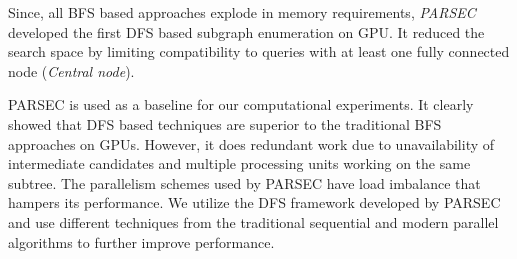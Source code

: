 Since, all BFS based approaches explode in memory requirements, \textit{PARSEC} \cite{PARSEC_VD} developed the first DFS based subgraph enumeration on GPU.
It reduced the search space by limiting compatibility to queries with at least one fully connected node (\textit{Central node}).

PARSEC \cite{PARSEC_VD} is used as a baseline for our computational experiments. It clearly showed that DFS based techniques are superior to the traditional BFS approaches on GPUs.
However, it does redundant work due to unavailability of intermediate candidates and multiple processing units working on the same subtree.
The parallelism schemes used by PARSEC have load imbalance that hampers its performance.
We utilize the DFS framework developed by PARSEC and use different techniques from the traditional sequential and modern parallel algorithms to further improve performance.